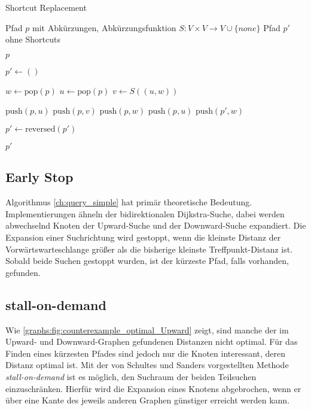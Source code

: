 \begin{algorithm}[ht]
  \caption{Shortcut Replacement}
  \begin{algorithmic}[1]
    \Require Pfad $p$ mit Abkürzungen, Abkürzungsfunktion $S \colon V \times V \to V \cup \{ {none} \}$
    \Ensure Pfad $p'$ ohne Shortcuts

    \State \Return $p$
    \EndIf
    \State

    \State $p' \leftarrow ()$
    \State

    \State $w \leftarrow \text{pop}(p)$
    \State $u \leftarrow \text{pop}(p)$
    \State $v \leftarrow S((u, w))$
    \State

    \State $\text{push}(p, u)$
    \State $\text{push}(p, v)$
    \State $\text{push}(p, w)$
    \Else
    \State $\text{push}(p, u)$
    \State $\text{push}(p', w)$
    \EndIf
    \EndWhile

    \State
    \State $p' \leftarrow \text{reversed}(p')$

    \State
    \State \Return $p'$
  \end{algorithmic}
  \label{ch:alg:shortcut_replacement}
\end{algorithm}

\subsection{Early Stop}

Algorithmus \ref{ch:query_simple} hat primär theoretische Bedeutung.
Implementierungen ähneln der bidirektionalen Dijkstra-Suche, dabei werden abwechselnd Knoten der Upward-Suche und der Downward-Suche expandiert.
Die Expansion einer Suchrichtung wird gestoppt, wenn die kleinste Distanz der Vorwärtswarteschlange größer als die bisherige kleinste Treffpunkt-Distanz ist.
Sobald beide Suchen gestoppt wurden, ist der kürzeste Pfad, falls vorhanden, gefunden.

\subsection{stall-on-demand}

Wie \autoref{graphs:fig:counterexample_optimal_Upward} zeigt, sind manche der im Upward- und Downward-Graphen gefundenen Distanzen nicht optimal.
Für das Finden eines kürzesten Pfades sind jedoch nur die Knoten interessant, deren Distanz optimal ist.
Mit der von Schultes und Sanders \cite{schultes2007dynamic} vorgestellten Methode \emph{stall-on-demand} ist es möglich, den Suchraum der beiden Teilsuchen einzuschränken.
Hierfür wird die Expansion eines Knotens abgebrochen, wenn er über eine Kante des jeweils anderen Graphen günstiger erreicht werden kann.

